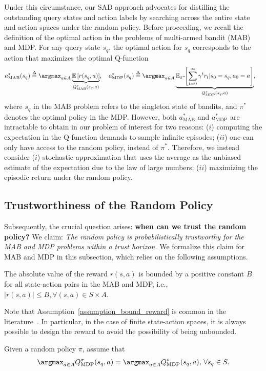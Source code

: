 Under this circumstance, our SAD approach advocates for distilling the outstanding query states and action labels by searching across the entire state and action spaces under the random policy. 
%
Before proceeding, we recall the definition of the optimal action in the problems of multi-armed bandit (MAB) and MDP. For any query state $s_q$, the optimal action for $s_q$ corresponds to the action that maximizes the optimal Q-function
%
\begin{align}
    &a_\text{MAB}^*(s_q) \overset{\Delta}{=} \argmax_{a \in A} \underbrace{\mbE \left[ r(s_q, a) \right]}_{Q_\text{MAB}^*(s_q, a)}, \quad a_\text{MDP}^*(s_q) \overset{\Delta}{=} \argmax_{a \in A} \underbrace{\mbE_{\pi^*} \!\! \left[ \sum_{t=0}^\infty \gamma^t  r_t | s_0=s_q, a_0=a \right]}_{Q_\text{MDP}^*(s_q, a)},
\end{align}
%
where $s_q$ in the MAB problem refers to the singleton state of bandits, and $\pi^*$ denotes the optimal policy in the MDP.
%
%
However, both $a_\text{MAB}^*$ and $a_\text{MDP}^*$ are intractable to obtain in our problem of interest for two reasons: ($i$) computing the expectation in the Q-function demands to sample infinite episodes; ($ii$) one can only have access to the random policy, instead of $\pi^*$. Therefore, we instead consider ($i$) stochastic approximation that uses the average as the unbiased estimate of the expectation due to the law of large numbers; ($ii$) maximizing the episodic return under the random policy.
%
%
%

\subsection{Trustworthiness of the Random Policy}







Subsequently, the crucial question arises: \textbf{when can we trust the random policy?}
%
We claim: \textit{The random policy is probabilistically trustworthy for the MAB and MDP problems within a trust horizon.}
%
%
We formalize this claim for MAB and MDP in this subsection, which relies on the following assumptions.
%
\begin{assumption}\label{assumption_bound_reward}
   The absolute value of the reward $r(s, a)$ is bounded by a positive constant $B$ for all state-action pairs in the MAB and MDP, i.e., $|r(s, a)| \leq B, \forall (s, a) \in S \times A.$
\end{assumption}
%
%
Note that Assumption~\ref{assumption_bound_reward} is common in the literature~\citep{azar2017minimax, wei2020model, zhang2021near}. 
In particular, in the case of finite state-action spaces, it is always possible to design the reward to avoid the possibility of being unbounded.
%
%
%
%
\begin{assumption}\label{assumption_mdp_equal}
    Given a random policy $\pi$, assume that
    \begin{align}
        \argmax_{ a \in A} Q_\text{MDP}^\pi(s_q, a) = \argmax_{a \in A} Q_\text{MDP}^*(s_q, a), \, \forall s_q \in S.
    \end{align}
\end{assumption}


